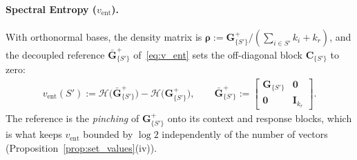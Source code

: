 \documentclass{article}
\begin{document}
\paragraph{Spectral Entropy ($v_{\text{ent}}$).}
With orthonormal bases, the density matrix is $\boldsymbol{\rho} := \mathbf{G}^{+}_{\{S'\}} / (\sum_{i \in S'} k_i + k_r)$, and the decoupled reference $\bar{\mathbf{G}}^{+}_{\{S'\}}$ of~\eqref{eq:v_ent} sets the off-diagonal block $\mathbf{C}_{\{S'\}}$ to zero:
\begin{align}\label{eq:set_v_ent}
    v_{\text{ent}}(S') := \mathcal{H}\big(\bar{\mathbf{G}}^{+}_{\{S'\}}\big) - \mathcal{H}\big(\mathbf{G}^{+}_{\{S'\}}\big), \qquad
    \bar{\mathbf{G}}^{+}_{\{S'\}} := \begin{bmatrix} \mathbf{G}_{\{S'\}} & \mathbf{0} \\ \mathbf{0} & \mathbf{I}_{k_r} \end{bmatrix}.
\end{align}
The reference is the \emph{pinching} of $\mathbf{G}^{+}_{\{S'\}}$ onto its context and response blocks, which is what keeps $v_{\text{ent}}$ bounded by $\log 2$ independently of the number of vectors (Proposition~\ref{prop:set_values}(iv)).
\end{document}
